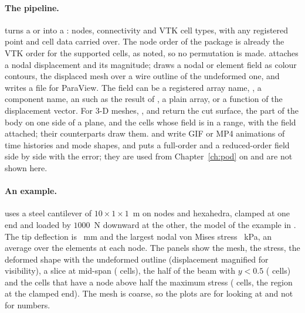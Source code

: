 \paragraph{The pipeline.}  turns a  or  into a : nodes, connectivity and VTK cell types, with any registered point and cell data carried over. The node order of the package is already the VTK order for the supported cells, as  noted, so no permutation is made.  attaches a nodal displacement and its magnitude;  draws a nodal or element field as colour contours,  the displaced mesh over a wire outline of the undeformed one, and  writes a file for ParaView. The field can be a registered array name, , a component name, an  such as the result of , a plain array, or a function of the displacement vector. For 3-D meshes, ,  and  return the cut surface, the part of the body on one side of a plane, and the cells whose field is in a range, with the field attached; their  counterparts draw them.  and  write GIF or MP4 animations of time histories and mode shapes, and  puts a full-order and a reduced-order field side by side with the error; they are used from Chapter~\ref{ch:pod} on and are not shown here.

\paragraph{An example.}  uses a steel cantilever of $10\times1\times1$~m on \cmeVizNodes{} nodes and \cmeVizElems{} hexahedra, clamped at one end and loaded by $1000$~N downward at the other, the model of the example in . The tip deflection is \cmeVizTip~mm and the largest nodal von Mises stress \cmeVizVmMax~kPa, an average over the elements at each node. The panels show the mesh, the stress, the deformed shape with the undeformed outline (displacement magnified for visibility), a slice at mid-span (\cmeVizSliceCells{} cells), the half of the beam with $y<0.5$ (\cmeVizClipCells{} cells) and the cells that have a node above half the maximum stress (\cmeVizThrCells{} cells, the region at the clamped end). The mesh is coarse, so the plots are for looking at and not for numbers.

